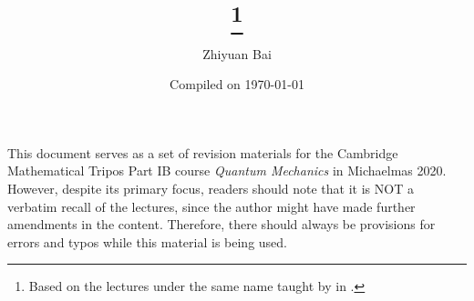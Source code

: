 \documentclass[a4paper]{article}
\title{\triposcourse{}
\thanks{Based on the lectures under the same name taught by \triposlecturer{} in \triposterm{}.}}
\author{Zhiyuan Bai}
\date{Compiled on \today}
\newcommand{\triposcourse}{Quantum Mechanics}
\newcommand{\triposterm}{Michaelmas 2020}
\newcommand{\tripospart}{IB}
\theoremstyle{plain}
\theoremstyle{definition}
\theoremstyle{remark}
\begin{document}
    \maketitle
    This document serves as a set of revision materials for the Cambridge Mathematical Tripos Part \tripospart{} course \textit{\triposcourse{}} in \triposterm{}.
    However, despite its primary focus, readers should note that it is NOT a verbatim recall of the lectures, since the author might have made further amendments in the content.
    Therefore, there should always be provisions for errors and typos while this material is being used.
    \tableofcontents
    
    
    
    
    
\end{document}
